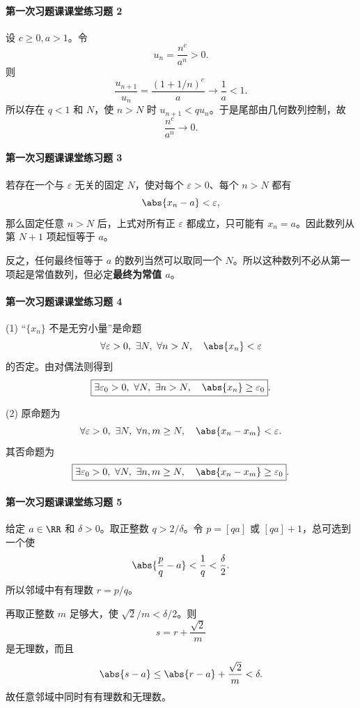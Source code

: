 \paragraph{第一次习题课课堂练习题 2}
\begin{xsolution}
设 $c\ge0,a>1$。令
\[
  u_n=\frac{n^c}{a^n}>0.
\]
则
\[
  \frac{u_{n+1}}{u_n}
  =\frac{(1+1/n)^c}{a}\to\frac1a<1.
\]
所以存在 $q<1$ 和 $N$，使 $n>N$ 时 $u_{n+1}<qu_n$。于是尾部由几何数列控制，故
\[
  \boxed{\frac{n^c}{a^n}\to0}.
\]
\end{xsolution}

\paragraph{第一次习题课课堂练习题 3}
\begin{xsolution}
若存在一个与 $\varepsilon$ 无关的固定 $N$，使对每个 $\varepsilon>0$、每个 $n>N$ 都有
\[
  \abs{x_n-a}<\varepsilon,
\]
那么固定任意 $n>N$ 后，上式对所有正 $\varepsilon$ 都成立，只可能有 $x_n=a$。因此数列从第 $N+1$ 项起恒等于 $a$。

反之，任何最终恒等于 $a$ 的数列当然可以取同一个 $N$。所以这种数列不必从第一项起是常值数列，但必定\textbf{最终为常值 $a$}。
\end{xsolution}

\paragraph{第一次习题课课堂练习题 4}
\begin{xsolution}
(1) “$\{x_n\}$ 不是无穷小量”是命题
\[
  \forall\varepsilon>0,\ \exists N,\ \forall n>N,
  \quad\abs{x_n}<\varepsilon
\]
的否定。由对偶法则得到
\[
  \boxed{\exists\varepsilon_0>0,\ \forall N,\ \exists n>N,
  \quad\abs{x_n}\ge\varepsilon_0}.
\]

(2) 原命题为
\[
  \forall\varepsilon>0,\ \exists N,\ \forall n,m\ge N,
  \quad\abs{x_n-x_m}<\varepsilon.
\]
其否命题为
\[
  \boxed{\exists\varepsilon_0>0,\ \forall N,\ \exists n,m\ge N,
  \quad\abs{x_n-x_m}\ge\varepsilon_0}.
\]
\end{xsolution}

\paragraph{第一次习题课课堂练习题 5}
\begin{xsolution}
给定 $a\in\RR$ 和 $\delta>0$。取正整数 $q>2/\delta$。令 $p=[qa]$ 或 $[qa]+1$，总可选到一个使
\[
  \abs{\frac pq-a}<\frac1q<\frac\delta2.
\]
所以邻域中有有理数 $r=p/q$。

再取正整数 $m$ 足够大，使 $\sqrt2/m<\delta/2$。则
\[
  s=r+\frac{\sqrt2}{m}
\]
是无理数，而且
\[
  \abs{s-a}\le\abs{r-a}+\frac{\sqrt2}{m}<\delta.
\]
故任意邻域中同时有有理数和无理数。
\end{xsolution}

